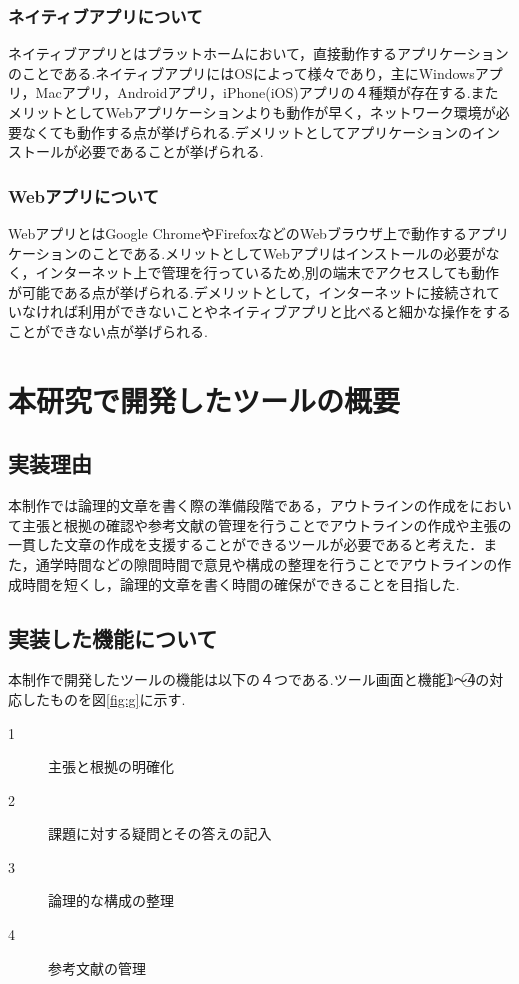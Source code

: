 \documentclass[a4j,12pt]{jarticle}
\begin{document}
\subsubsection{ネイティブアプリについて}
ネイティブアプリとはプラットホームにおいて，直接動作するアプリケーションのことである.ネイティブアプリにはOSによって様々であり，主にWindowsアプリ，Macアプリ，Androidアプリ，iPhone(iOS)アプリの４種類が存在する.またメリットとしてWebアプリケーションよりも動作が早く，ネットワーク環境が必要なくても動作する点が挙げられる.デメリットとしてアプリケーションのインストールが必要であることが挙げられる.

\subsubsection{Webアプリについて}
WebアプリとはGoogle ChromeやFirefoxなどのWebブラウザ上で動作するアプリケーションのことである.メリットとしてWebアプリはインストールの必要がなく，インターネット上で管理を行っているため,別の端末でアクセスしても動作が可能である点が挙げられる.デメリットとして，インターネットに接続されていなければ利用ができないことやネイティブアプリと比べると細かな操作をすることができない点が挙げられる.


\section{本研究で開発したツールの概要}
\subsection{実装理由}
本制作では論理的文章を書く際の準備段階である，アウトラインの作成をにおいて主張と根拠の確認や参考文献の管理を行うことでアウトラインの作成や主張の一貫した文章の作成を支援することができるツールが必要であると考えた．また，通学時間などの隙間時間で意見や構成の整理を行うことでアウトラインの作成時間を短くし，論理的文章を書く時間の確保ができることを目指した.

\subsection{実装した機能について}
本制作で開発したツールの機能は以下の４つである.ツール画面と機能\textcircled{\scriptsize 1}〜\textcircled{\scriptsize 4}の対応したものを図\ref{fig:g}に示す.
\begin{description}
  \item[\textcircled{\scriptsize 1}]主張と根拠の明確化
  \item[\textcircled{\scriptsize 2}]課題に対する疑問とその答えの記入
  \item[\textcircled{\scriptsize 3}]論理的な構成の整理
  \item[\textcircled{\scriptsize 4}]参考文献の管理
 \end{description}
\end{document}
